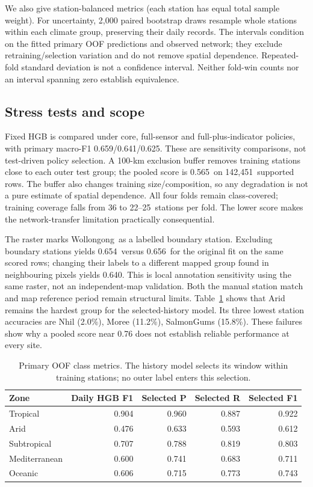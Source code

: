 \documentclass{article}
\newcommand{\CorePolicy}{0.659}
\newcommand{\WorstStations}{Nhil (2.0\%), Moree (11.2\%), SalmonGums (15.8\%)}
\newcommand{\FullPolicy}{0.641}
\newcommand{\IndicatorPolicy}{0.625}
\newcommand{\SpatialScore}{0.565}
\newcommand{\SpatialRows}{142,451}
\newcommand{\BufferedStations}{22--25}
\newcommand{\BoundaryStations}{Wollongong}
\newcommand{\BoundaryExclude}{0.654}
\newcommand{\BoundaryExcludeReference}{0.656}
\newcommand{\BoundaryAlternative}{0.640}
\begin{document}
We also give station-balanced metrics (each station has equal total sample weight). For uncertainty, 2,000 paired bootstrap draws resample whole stations within each climate group, preserving their daily records. The intervals condition on the fitted primary OOF predictions and observed network; they exclude retraining/selection variation and do not remove spatial dependence. Repeated-fold standard deviation is not a confidence interval. Neither fold-win counts nor an interval spanning zero establish equivalence.

\subsection{Stress tests and scope}
Fixed HGB is compared under core, full-sensor and full-plus-indicator policies, with primary macro-F1 \CorePolicy/\FullPolicy/\IndicatorPolicy. These are sensitivity comparisons, not test-driven policy selection. A 100-km exclusion buffer removes training stations close to each outer test group; the pooled score is \SpatialScore\ on \SpatialRows\ supported rows. The buffer also changes training size/composition, so any degradation is not a pure estimate of spatial dependence. All four folds remain class-covered; training coverage falls from 36 to \BufferedStations\ stations per fold. The lower score makes the network-transfer limitation practically consequential.

The raster marks \BoundaryStations\ as a labelled boundary station. Excluding boundary stations yields \BoundaryExclude\ versus \BoundaryExcludeReference\ for the original fit on the same scored rows; changing their labels to a different mapped group found in neighbouring pixels yields \BoundaryAlternative. This is local annotation sensitivity using the same raster, not an independent-map validation. Both the manual station match and map reference period remain structural limits. Table~\ref{tab:classes} shows that Arid remains the hardest group for the selected-history model. Its three lowest station accuracies are \WorstStations. These failures show why a pooled score near 0.76 does not establish reliable performance at every site.
\begin{table}[htbp]
\centering\small
\caption{Primary OOF class metrics. The history model selects its window within training stations; no outer label enters this selection.}\label{tab:classes}
\begin{tabular}{lrrrr}\toprule
Zone & Daily HGB F1 & Selected P & Selected R & Selected F1 \\ \midrule
Tropical & 0.904 & 0.960 & 0.887 & 0.922 \\
Arid & 0.476 & 0.633 & 0.593 & 0.612 \\
Subtropical & 0.707 & 0.788 & 0.819 & 0.803 \\
Mediterranean & 0.600 & 0.741 & 0.683 & 0.711 \\
Oceanic & 0.606 & 0.715 & 0.773 & 0.743 \\
\bottomrule\end{tabular}
\end{table}
\FloatBarrier
\end{document}
